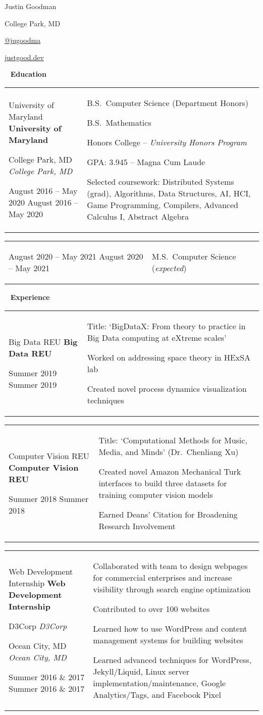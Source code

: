\documentclass[11pt,letterpaper]{article}
\newcommand{\sect}[1]{
	\begin{center}
		\noindent\xrfill[0.7ex]{0.5pt} \mbox{ } {\Large \bf #1} \mbox{ } \xrfill[0.7ex]{0.5pt}
	\end{center}
}
\newcommand{\entry}[5]{
	{\small
	\noindent
	\begin{tabular}{p{2in} p{\dimexpr \linewidth-2\tabcolsep-2.25in}} %
		\ifx #1  \else \noindent \textbf{#1} \fi
		
		\ifx #2  \else \noindent \textit{#2} \fi
		
		\ifx #3  \else \noindent \textit{#3} \fi
		
		\ifx #4  \else \noindent #4 \fi
		&
		#5
	\end{tabular}
	}
	\vspace{1mm}
}
\begin{document}
\thispagestyle{empty}
\begin{center}
	{\LARGE Justin Goodman}
\end{center}
\begin{center}
	\begin{multicols}{3}
		\faMapMarker \hspace{0.25cm} College Park, MD
		
		\columnbreak
		
		\faGithub \hspace{0.25cm} \href{https://github.com/jugoodma}{@jugoodma}
		
		\columnbreak
		
		\faCode \hspace{0.25cm} \href{https://justgood.dev}{justgood.dev}
	\end{multicols}
\end{center}

\sect{Education}

\entry{University of Maryland}{College Park, MD}{}{August 2016 -- May 2020}{
	B.S.\ Computer Science (Department Honors)
	
	B.S.\ Mathematics
	
	Honors College -- \textit{University Honors Program}
	
	GPA: 3.945 -- Magna Cum Laude
	
	{\small Selected coursework:} {\footnotesize Distributed Systems (grad), Algorithms, Data Structures, AI, HCI, Game Programming, Compilers, Advanced Calculus I, Abstract Algebra}
}

\entry{}{}{}{August 2020 -- May 2021}{
	M.S.\ Computer Science (\textit{expected})
}

\sect{Experience}

\entry{Big Data REU}{}{}{Summer 2019}{
	Title: `BigDataX: From theory to practice in Big Data computing at eXtreme scales'
	
	Worked on addressing space theory in HExSA lab
	
	Created novel process dynamics visualization techniques
}

\entry{Computer Vision REU}{}{}{Summer 2018}{
	Title: `Computational Methods for Music, Media, and Minds' (Dr.\ Chenliang Xu)
	
	Created novel Amazon Mechanical Turk interfaces to build three datasets for training computer vision models
	
	Earned Deans' Citation for Broadening Research Involvement
}

\entry{Web Development Internship}{D3Corp}{Ocean City, MD}{Summer 2016 \& 2017}{
	Collaborated with team to design webpages for commercial enterprises and increase visibility through search engine optimization
	
	Contributed to over 100 websites
	
	Learned how to use WordPress and content management systems for building websites
	
	Learned advanced techniques for WordPress, Jekyll/Liquid, Linux server implementation/maintenance, Google Analytics/Tags, and Facebook Pixel
}
\end{document}
